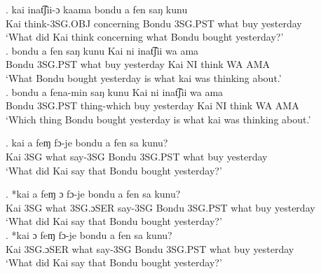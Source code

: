 \documentclass{assets/fieldnotes}
\begin{document}
\exg. kai inat͡ʃii-ɔ kaama bondu a fen saŋ kunu\\
Kai think-3SG.OBJ concerning Bondu 3SG.PST what buy yesterday\\
`What did Kai think concerning what Bondu bought yesterday?' \\

\exg. bondu a fen saŋ kunu Kai ni inat͡ʃii wa ama\\
Bondu 3SG.PST what buy yesterday Kai NI think WA AMA\\
`What Bondu bought yesterday is what kai was thinking about.'\\

\exg. bondu a fena-min saŋ kunu Kai ni inat͡ʃii wa ama\\
Bondu 3SG.PST thing-which buy yesterday Kai NI think WA AMA\\
`Which thing Bondu bought yesterday is what kai was thinking about.' \\





\exg. kai a feɱ fɔ-je bondu a fen sa kunu?\\
Kai 3SG what say-3SG Bondu 3SG.PST what buy yesterday\\
`What did Kai say that Bondu bought yesterday?' \\ 


\exg. *kai a feɱ ɔ fɔ-je bondu a fen sa kunu?\\
Kai 3SG what 3SG.ɔSER say-3SG Bondu 3SG.PST what buy yesterday\\
`What did Kai say that Bondu bought yesterday?' \\ 

\exg. *kai ɔ feɱ fɔ-je bondu a fen sa kunu?\\
Kai 3SG.ɔSER what say-3SG Bondu 3SG.PST what buy yesterday\\
`What did Kai say that Bondu bought yesterday?' \\ 
\end{document}

